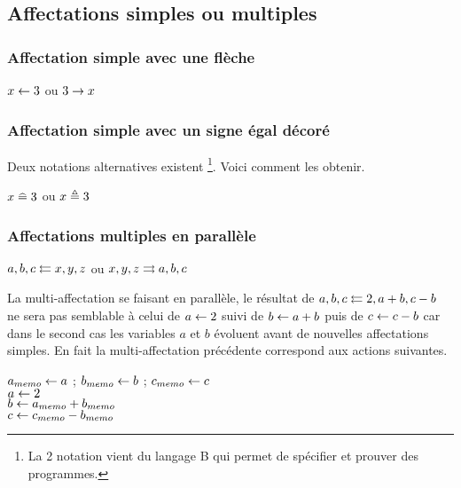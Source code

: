 \documentclass[12pt,a4paper]{article}
\begin{document}

\subsection{Affectations simples ou multiples}

\subsubsection{Affectation simple avec une flèche}

\begin{latexex}
$x \Store 3$ ou
$3 \rightarrow x$
\end{latexex}




\subsubsection{Affectation simple avec un signe égal décoré}

Deux notations alternatives existent
\footnote{
	La 2\ieme{} notation vient du langage B qui permet de spécifier et prouver des programmes.
}.
Voici comment les obtenir.

\begin{latexex}
$x \Store* 3$ ou
$x \Store** 3$
\end{latexex}




\subsubsection{Affectations multiples en parallèle}

\begin{latexex}
$a, b, c \leftleftarrows x, y, z$ ou
$x, y, z \rightrightarrows a, b, c$
\end{latexex}


\begin{remark}
	La multi-affectation se faisant en parallèle, le résultat de $a, b, c \MStore 2, a + b, c - b$ ne sera pas semblable à celui de $a \Store 2$ suivi de $b \Store a + b$ puis de $c \Store c - b$ car dans le second cas les variables $a$ et $b$ évoluent avant de nouvelles affectations simples. En fait la multi-affectation précédente correspond aux actions suivantes.

    \begin{algo}[
    	frame,
    	title = {Comment $a, b, c \MStore 2, a + b, c - b$ fonctionne-t-il ?}
    ]
    
    	$a_{memo} \Store a$ ;
    	$b_{memo} \Store b$ ;
    	$c_{memo} \Store c$
    	\\
    	\BlankLine
    	$a \Store 2$
    	\\
    	$b \Store a_{memo} + b_{memo}$
    	\\
    	$c \Store c_{memo} - b_{memo}$
    \end{algo}
\end{remark}
\end{document}
